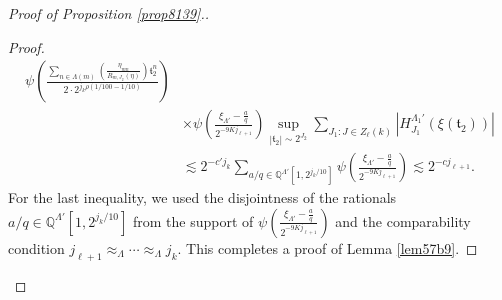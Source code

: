 \documentclass[10pt,a4paper]{amsart}
\numberwithin{equation}{section}
\begin{document}
\begin{proof}[Proof of Proposition \ref{prop8139}.]
\begin{proof}
\begin{align*}
		\psi\!\left(
		\frac{
			\sum_{n\in\Lambda(m)} \left(\frac{\eta_{mn}}{R_{m,J_2}(\eta)} \right)\mathfrak{t}_2^n
		}
		{ 2\cdot 2^{j_k\rho  (1/100-1/10)}}
		\right)\\
&\times \psi\left(\frac{\xi_{\Lambda'}-\frac{a}{q}}{2^{-9Kj_{\ell+1}}}\right)
		 \sup_{|\mathfrak{t}_2|\sim 2^{J_2}} \sum_{J_1:J\in Z_\ell(k)}\left| H^{\Lambda_{1}'}_{J_{1}}\left(\xi(\mathfrak{t}_2) \right)\right|
		 \\
		& \lesssim 2^{-c'j_k}\sum_{ a/q\in \mathbb{Q}^{\Lambda'}[1,2^{j_k/10}]}\psi\left(\frac{\xi_{\Lambda'}-\frac{a}{q}}{2^{-9Kj_{\ell+1}}}\right)\lesssim 2^{-cj_{\ell+1}}. \nonumber
	\end{align*}
For the last inequality, we used the disjointness of the rationals
\( a/q\in \mathbb{Q}^{\Lambda'}[1,2^{j_k/10}] \)
from the support of
\( \psi\!\left(\frac{\xi_{\Lambda'}-\frac{a}{q}}{2^{-9Kj_{\ell+1}}}\right) \) and the comparability condition
\( j_{\ell+1}\approx_{\Lambda}\cdots \approx_{\Lambda} j_{k} \).
	This completes a proof of Lemma \ref{lem57b9}.\end{proof}
 


\end{proof}
\end{document}
